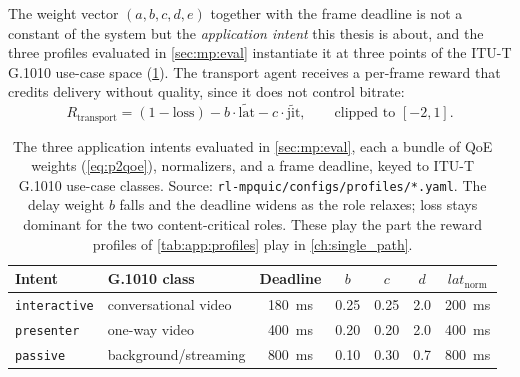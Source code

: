 The weight vector $(a,b,c,d,e)$ together with the frame deadline is not a constant of the system but
the \emph{application intent} this thesis is about, and the three profiles evaluated in
\cref{sec:mp:eval} instantiate it at three points of the ITU-T G.1010 use-case space
(\cref{tab:p2profiles}). The transport agent receives a per-frame reward that credits delivery without
quality, since it does not control bitrate:
\begin{equation}
R_{\text{transport}} = (1 - \mathrm{loss}) - b\cdot\widetilde{\mathrm{lat}} - c\cdot\widetilde{\mathrm{jit}},
\qquad \text{clipped to } [-2, 1].
\label{eq:p2transport}
\end{equation}

\begin{table}[t]
  \centering
  \caption[The three application intents evaluated in Chapter 5]{The three application intents evaluated in \cref{sec:mp:eval}, each a bundle of QoE weights
  (\cref{eq:p2qoe}), normalizers, and a frame deadline, keyed to ITU-T G.1010 use-case classes. Source:
  \texttt{rl-mpquic/configs/profiles/*.yaml}. The delay weight $b$ falls and the deadline widens as the
  role relaxes; loss stays dominant for the two content-critical roles. These play the part the reward
  profiles of \cref{tab:app:profiles} play in \cref{ch:single_path}.}
  \label{tab:p2profiles}
  \begin{tabular}{llccccc}
    \toprule
    Intent & G.1010 class & Deadline & $b$ & $c$ & $d$ & $\mathit{lat}_{\mathrm{norm}}$ \\
    \midrule
    \texttt{interactive} & conversational video & \SI{180}{\milli\second} & 0.25 & 0.25 & 2.0 & \SI{200}{\milli\second} \\
    \texttt{presenter}   & one-way video        & \SI{400}{\milli\second} & 0.20 & 0.20 & 2.0 & \SI{400}{\milli\second} \\
    \texttt{passive}     & background/streaming & \SI{800}{\milli\second} & 0.10 & 0.30 & 0.7 & \SI{800}{\milli\second} \\
    \bottomrule
  \end{tabular}
\end{table}

